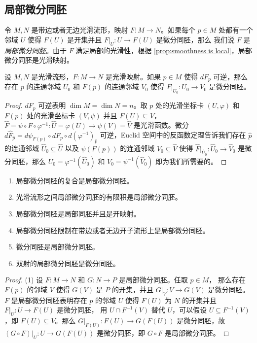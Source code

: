\documentclass[fontset=none]{Notes}
\begin{document}
\subsection{局部微分同胚}

令 $M,N$ 是带边或者无边光滑流形，映射 $F:M\to N$。如果每个 $p\in M$
处都有一个邻域 $U$ 使得 $F(U)$ 是开集并且 $F|_U:U\to F(U)$ 是微分同胚，那么
我们说 $F$ 是\emph{局部微分同胚}。由于 $F$ 满足局部的光滑性，根据
\autoref{prop:smoothness is local}，局部微分同胚是光滑映射。

\begin{theorem}[流形上的反函数定理]
  设 $M,N$ 是光滑流形，$F:M\to N$ 是光滑映射。如果 $p\in M$ 使得
  $dF_p$ 可逆，那么存在 $p$ 的连通邻域 $U_0$ 和 $F(p)$ 的连通邻域 $V_0$
  使得 $F|_{U_0}:U_0\to V_0$ 是微分同胚。
\end{theorem}
\begin{proof}
  $dF_p$ 可逆表明 $\dim M=\dim N=n$。取 $p$ 处的光滑坐标卡 $(U,\varphi)$
  和 $F(p)$ 处的光滑坐标卡 $(V,\psi)$ 并且 $F(U)\subseteq V$，
  $\hat F=\psi\circ F\circ\varphi^{-1}:\hat U=\varphi(U)\to \psi(V)=\hat V$
  是光滑函数。微分 $d\hat F_{\hat p}=d\psi_{F(p)}\circ dF_p\circ d(\varphi^{-1})_{\hat p}$
  可逆，Euclid 空间中的反函数定理告诉我们存在 $\hat p$ 的连通邻域 $\hat U_0\subseteq\hat U$
  以及 $\psi(F(p))$ 的连通邻域 $\hat V_0\subseteq \hat V$ 使得 
  $\hat F|_{\hat U_0}:\hat U_0\to\hat V_0$ 是微分同胚，那么 $U_0=\varphi^{-1}(\hat U_0)$
  和 $V_0=\psi^{-1}(\hat V_0)$ 即为我们所需要的。
\end{proof}

\begin{proposition}[局部微分同胚的基本性质]
  \mbox{}
  \begin{enumerate}
    \item 局部微分同胚的复合是局部微分同胚。
    \item 光滑流形之间局部微分同胚的有限积是局部微分同胚。
    \item 局部微分同胚是局部同胚并且是开映射。
    \item 局部微分同胚限制在带边或者无边开子流形上是局部微分同胚。
    \item 微分同胚是局部微分同胚。
    \item 双射的局部微分同胚是微分同胚。
  \end{enumerate}
\end{proposition}
\begin{proof}
  (1) 设 $F:M\to N$ 和 $G:N\to P$ 是局部微分同胚。任取 $p\in M$，
  那么存在 $F(p)$ 的邻域 $V$ 使得 $G(V)$ 是 $P$ 的开集，并且 
  $G|_V:V\to G(V)$ 是微分同胚。$F$ 是局部微分同胚表明存在 $p$
  的邻域 $U$ 使得 $F(U)$ 为 $N$ 的开集并且 $F|_U:U\to F(U)$ 是微分同胚，
  用 $U\cap F^{-1}(V)$ 替代 $U$，可以假设 $U\subseteq F^{-1}(V)$，即
  $F(U)\subseteq V$。那么 $G|_{F(U)}:F(U)\to G(F(U))$ 是微分同胚，故
  $(G\circ F)|_U:U\to G(F(U))$ 是微分同胚，即 $G\circ F$ 是局部微分同胚。
\end{proof}
\end{document}
